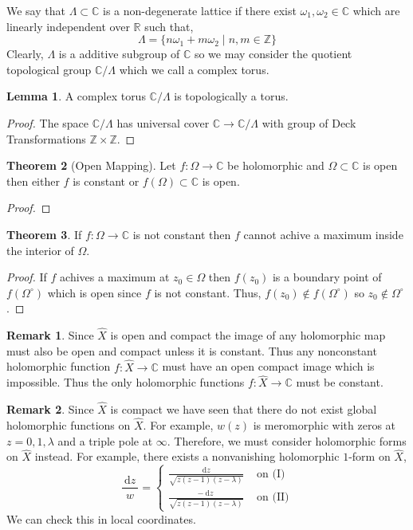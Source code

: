 \documentclass[12pt]{extarticle}
\newcommand{\Z}{\mathbb{Z}}
\newcommand{\R}{\mathbb{R}}
\newcommand{\C}{\mathbb{C}}
\renewcommand{\d}[1]{\: \mathrm{d}#1 \:}
\theoremstyle{definition}
\newtheorem{theorem}{Theorem}[section]
\newtheorem{lemma}[theorem]{Lemma}
\newtheorem{remark}{Remark}
\newenvironment{definition}[1][Definition:]{\begin{trivlist}
\item[\hskip \labelsep {\bfseries #1}]}{\end{trivlist}}
\begin{document}
\begin{definition}
We say that $\Lambda \subset \C$ is a non-degenerate lattice if there exist $\omega_1, \omega_2 \in \C$ which are linearly independent over $\R$ such that,
\[ \Lambda = \{ n \omega_1 + m \omega_2 \mid n,m \in \Z \} \]
Clearly, $\Lambda$ is a additive subgroup of $\C$ so we may consider the quotient topological group $\C / \Lambda$ which we call a complex torus.
\end{definition}

\begin{lemma}
A complex torus $\C / \Lambda$ is topologically a torus.
\end{lemma}

\begin{proof}
The space $\C / \Lambda$ has universal cover $\C \to \C / \Lambda$ with group of Deck Transformations $\Z \times \Z$. 
\end{proof}

\begin{theorem}[Open Mapping]
Let $f : \Omega \to \C$ be holomorphic and $\Omega \subset \C$ is open then either $f$ is constant or $f(\Omega) \subset \C$ is open.
\end{theorem}

\begin{proof}

\end{proof}

\begin{theorem}
If $f : \Omega \to \C$ is not constant then $f$ cannot achive a maximum inside the interior of $\Omega$. 
\end{theorem}

\begin{proof}
If $f$ achives a maximum at $z_0 \in \Omega$ then $f(z_0)$ is a boundary point of $f(\Omega^\circ)$ which is open since $f$ is not constant. Thus, $f(z_0) \notin f(\Omega^\circ)$ so $z_0 \notin \Omega^\circ$. 
\end{proof}


\begin{remark}
Since $\hat{X}$ is open and compact the image of any holomorphic map must also be open and compact unless it is constant. Thus any nonconstant holomorphic function $f : \hat{X} \to \C$ must have an open compact image which is impossible. Thus the only holomorphic functions $f : \hat{X} \to \C$ must be constant. 
\end{remark}

\begin{remark}
Since $\hat{X}$ is compact we have seen that there do not exist global holomorphic functions on $\hat{X}$. For example, $w(z)$ is meromorphic with zeros at $z = 0, 1, \lambda$ and a triple pole at $\infty$. Therefore, we must consider holomorphic forms on $\hat{X}$ instead. For example, there exists a nonvanishing holomorphic $1$-form on $\hat{X}$,
\[ \frac{\d{z}}{w} = 
\begin{cases}
\frac{\d{z}}{\sqrt{z(z - 1)(z - \lambda)}}   & \text{ on (I)}
\\
\frac{-\d{z}}{\sqrt{z(z - 1)(z - \lambda)}}   & \text{ on (II)}
\end{cases} \]
We can check this in local coordinates. 
\end{remark}
\end{document}

